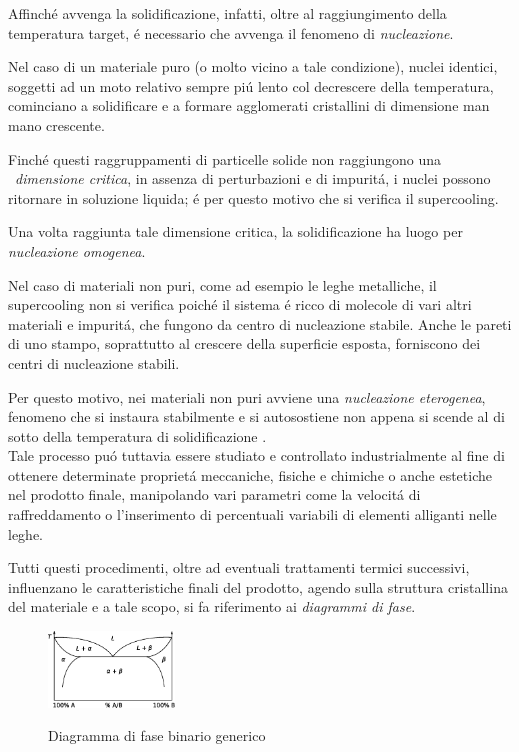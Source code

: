 \documentclass{article}
\begin{document}
        Affinché avvenga la solidificazione, infatti, oltre al raggiungimento della temperatura target,
        é necessario che avvenga il fenomeno di \textit{nucleazione}. 

        Nel caso di un materiale puro (o molto vicino a tale condizione), nuclei identici, soggetti 
        ad un moto relativo sempre piú lento col decrescere della temperatura,
        cominciano a solidificare e a formare agglomerati cristallini di dimensione man mano crescente.

        Finché questi raggruppamenti di particelle solide non raggiungono una \
        \textit{dimensione critica}, in assenza di perturbazioni e di impuritá, i nuclei possono 
        ritornare in soluzione liquida; é per questo motivo che si verifica il supercooling.

        Una volta raggiunta tale dimensione critica, la solidificazione ha luogo per 
        \textit{nucleazione omogenea}.  

        Nel caso di materiali non puri, come ad esempio le leghe metalliche, il supercooling
        non si verifica poiché il sistema é ricco di molecole di vari altri materiali e impuritá, 
        che fungono da centro di nucleazione stabile. Anche le pareti di uno stampo, soprattutto 
        al crescere della superficie esposta, forniscono dei centri di nucleazione stabili. 

        Per questo motivo, nei materiali non puri avviene una \textit{nucleazione eterogenea}, 
        fenomeno che si instaura stabilmente e si autosostiene non appena si scende al di sotto della temperatura di 
        solidificazione \autocite{Mouritz}. \\ 

        Tale processo puó tuttavia essere studiato e controllato industrialmente al fine di 
        ottenere determinate proprietá meccaniche, fisiche e chimiche o anche estetiche nel prodotto finale, 
        manipolando vari parametri come la velocitá di raffreddamento o l'inserimento di percentuali
        variabili di elementi alliganti nelle leghe. 

        Tutti questi procedimenti, oltre ad eventuali trattamenti termici successivi, influenzano le 
        caratteristiche finali del prodotto, agendo sulla struttura cristallina del materiale e
        a tale scopo, si fa riferimento ai \textit{diagrammi di fase}.

            \begin{figure}[h!]
                \centering
                 \label{fig:diagramma_fase}
                \includegraphics[width=0.3\textwidth]{diagramma_fase.eps}
                \caption{Diagramma di fase binario generico \autocite{phase_diagram_generic}}
            \end{figure}
        
\end{document}
